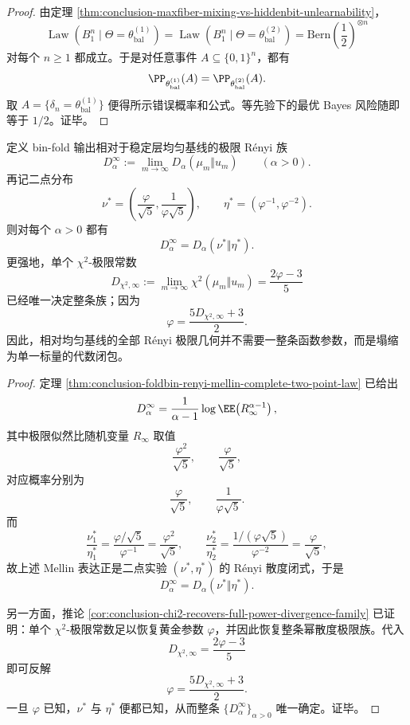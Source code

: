 \begin{proof}
由定理 \ref{thm:conclusion-maxfiber-mixing-vs-hiddenbit-unlearnability}，
\[
\operatorname{Law}(B_1^n\mid \Theta=\theta_{\mathrm{bal}}^{(1)})
=
\operatorname{Law}(B_1^n\mid \Theta=\theta_{\mathrm{bal}}^{(2)})
=
\mathrm{Bern}\!\left(\frac12\right)^{\otimes n}
\]
对每个 \(n\ge 1\) 都成立。于是对任意事件 \(A\subseteq\{0,1\}^n\)，都有
\[
\PP_{\theta_{\mathrm{bal}}^{(1)}}(A)=\PP_{\theta_{\mathrm{bal}}^{(2)}}(A).
\]
取
\(
A=\{\delta_n=\theta_{\mathrm{bal}}^{(1)}\}
\)
便得所示错误概率和公式。等先验下的最优 Bayes 风险随即等于 \(1/2\)。证毕。
\end{proof}

\begin{theorem}\label{thm:conclusion-maxfiber-renyi-family-single-chi2-closure}
定义 bin-fold 输出相对于稳定层均匀基线的极限 Rényi 族
\[
D_\alpha^\infty:=\lim_{m\to\infty}D_\alpha(\mu_m\Vert u_m)
\qquad (\alpha>0).
\]
再记二点分布
\[
\nu^\ast=
\left(
\frac{\varphi}{\sqrt5},
\frac{1}{\varphi\sqrt5}
\right),
\qquad
\eta^\ast=
\left(
\varphi^{-1},
\varphi^{-2}
\right).
\]
则对每个 \(\alpha>0\) 都有
\[
D_\alpha^\infty=D_\alpha(\nu^\ast\Vert \eta^\ast).
\]
更强地，单个 \(\chi^2\)-极限常数
\[
D_{\chi^2,\infty}:=\lim_{m\to\infty}\chi^2(\mu_m\Vert u_m)=\frac{2\varphi-3}{5}
\]
已经唯一决定整条族；因为
\[
\varphi=\frac{5D_{\chi^2,\infty}+3}{2}.
\]
因此，相对均匀基线的全部 Rényi 极限几何并不需要一整条函数参数，而是塌缩为单一标量的代数闭包。
\end{theorem}

\begin{proof}
定理 \ref{thm:conclusion-foldbin-renyi-mellin-complete-two-point-law} 已给出
\[
D_\alpha^\infty
=
\frac{1}{\alpha-1}\log \EE\!\left(R_\infty^{\alpha-1}\right),
\]
其中极限似然比随机变量 \(R_\infty\) 取值
\[
\frac{\varphi^2}{\sqrt5},
\qquad
\frac{\varphi}{\sqrt5},
\]
对应概率分别为
\[
\frac{\varphi}{\sqrt5},
\qquad
\frac{1}{\varphi\sqrt5}.
\]
而
\[
\frac{\nu^\ast_1}{\eta^\ast_1}
=
\frac{\varphi/\sqrt5}{\varphi^{-1}}
=
\frac{\varphi^2}{\sqrt5},
\qquad
\frac{\nu^\ast_2}{\eta^\ast_2}
=
\frac{1/(\varphi\sqrt5)}{\varphi^{-2}}
=
\frac{\varphi}{\sqrt5},
\]
故上述 Mellin 表达正是二点实验 \((\nu^\ast,\eta^\ast)\) 的 Rényi 散度闭式，于是
\[
D_\alpha^\infty=D_\alpha(\nu^\ast\Vert \eta^\ast).
\]

另一方面，推论 \ref{cor:conclusion-chi2-recovers-full-power-divergence-family} 已证明：单个 \(\chi^2\)-极限常数足以恢复黄金参数 \(\varphi\)，并因此恢复整条幂散度极限族。代入
\[
D_{\chi^2,\infty}=\frac{2\varphi-3}{5}
\]
即可反解
\[
\varphi=\frac{5D_{\chi^2,\infty}+3}{2}.
\]
一旦 \(\varphi\) 已知，\(\nu^\ast\) 与 \(\eta^\ast\) 便都已知，从而整条 \(\{D_\alpha^\infty\}_{\alpha>0}\) 唯一确定。证毕。
\end{proof}

